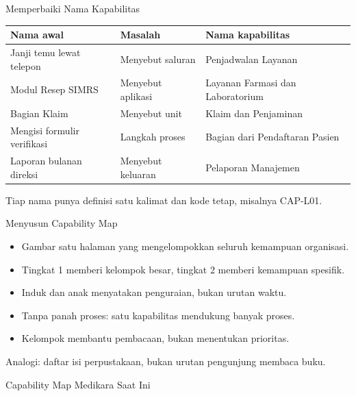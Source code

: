 \documentclass[aspectratio=169, table, 12pt]{beamer}
\begin{document}
\begin{frame}{{\Large Memperbaiki Nama Kapabilitas}}
  \footnotesize
  \begin{tabularx}{\textwidth}{>{\raggedright\arraybackslash}p{4.4cm}
      >{\raggedright\arraybackslash}X >{\raggedright\arraybackslash}p{4.6cm}}
    \hline
    \textbf{Nama awal} & \textbf{Masalah} & \textbf{Nama kapabilitas} \\
    \hline
    Janji temu lewat telepon & Menyebut saluran & Penjadwalan Layanan \\
    \hline
    Modul Resep SIMRS & Menyebut aplikasi & Layanan Farmasi dan Laboratorium \\
    \hline
    Bagian Klaim & Menyebut unit & Klaim dan Penjaminan \\
    \hline
    Mengisi formulir verifikasi & Langkah proses & Bagian dari Pendaftaran Pasien \\
    \hline
    Laporan bulanan direksi & Menyebut keluaran & Pelaporan Manajemen \\
    \hline
  \end{tabularx}

  \vspace{8pt}
  \small Tiap nama punya definisi satu kalimat dan kode tetap, misalnya CAP-L01.
\end{frame}

\begin{frame}{{\Large Menyusun Capability Map}}
  \vspace{10pt}
  \begin{itemize}
    \item Gambar satu halaman yang mengelompokkan seluruh kemampuan organisasi.
    \item Tingkat 1 memberi kelompok besar, tingkat 2 memberi kemampuan spesifik.
    \item Induk dan anak menyatakan penguraian, bukan urutan waktu.
    \item Tanpa panah proses: satu kapabilitas mendukung banyak proses.
    \item Kelompok membantu pembacaan, bukan menentukan prioritas.
  \end{itemize}
  \vspace{6pt}
  {\small Analogi: daftar isi perpustakaan, bukan urutan pengunjung membaca buku.}
\end{frame}

\begin{frame}{{\Large Capability Map Medikara Saat Ini}}
  \centering
\end{frame}
\end{document}

